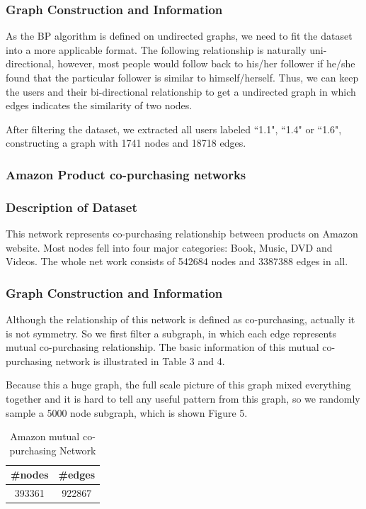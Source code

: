 \subsubsection*{Graph Construction and Information}
As the BP algorithm is defined on undirected graphs, we need to fit the dataset into a more applicable format.
The following relationship is naturally uni-directional, however, most people would follow back to his/her follower if he/she found that the particular follower is similar to himself/herself.
Thus, we can keep the users and their bi-directional relationship to get a undirected graph in which edges indicates the similarity of two nodes.

After filtering the dataset, we extracted all users labeled ``1.1", ``1.4" or ``1.6", constructing a graph with 1741 nodes and 18718 edges.


\subsubsection{Amazon Product co-purchasing networks}

\subsubsection*{Description of Dataset}
This network represents co-purchasing relationship between products on Amazon website. Most nodes fell into four major categories: Book, Music, DVD and Videos. The whole net work consists of 542684 nodes and 3387388 edges in all.


\subsubsection*{Graph Construction and Information}
Although the relationship of this network is defined as co-purchasing, actually it is not symmetry. So we first filter a subgraph, in which each edge represents mutual co-purchasing relationship. The basic information of this mutual co-purchasing network is illustrated in Table 3 and 4. 

Because this a huge graph, the full scale picture of this graph mixed everything together and it is hard to tell any useful pattern from this graph, so we randomly sample a 5000 node subgraph, which is shown Figure 5.

\begin{table}[!ht]
\centering
\begin{tabular}{cc}
\toprule
\textbf{\#nodes} & \textbf{\#edges}\\
\midrule
393361 & 922867\\
\bottomrule
\end{tabular}
\caption{Amazon mutual co-purchasing Network}
\end{table}

